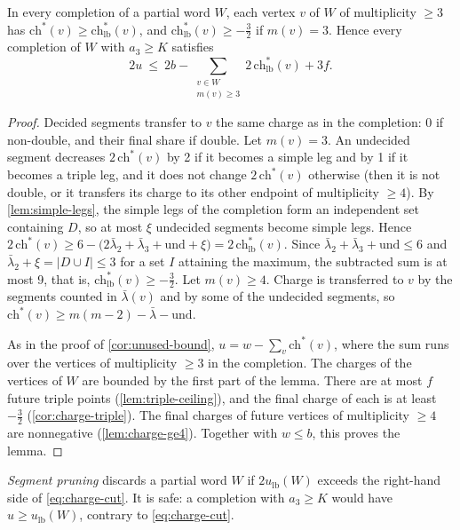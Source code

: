 \begin{lemma}\label{lem:placed-charges}
In every completion of a partial word $W$, each vertex $v$ of $W$ of multiplicity $\ge3$ has $\mathrm{ch}^*(v)\ge\mathrm{ch}^*_{\mathrm{lb}}(v)$, and $\mathrm{ch}^*_{\mathrm{lb}}(v)\ge-\tfrac32$ if $m(v)=3$.
Hence every completion of $W$ with $a_3\ge K$ satisfies
\begin{equation}\label{eq:charge-cut}
2u\ \le\ 2b-\sum_{\substack{v\in W\\ m(v)\ge3}}
2\,\mathrm{ch}^*_{\mathrm{lb}}(v)+3f .
\end{equation}
\end{lemma}
\begin{proof}
Decided segments transfer to $v$ the same charge as in the completion: 0 if non-double, and their final share if double.
Let $m(v)=3$. An undecided segment decreases $2\,\mathrm{ch}^*(v)$ by 2 if it becomes a simple leg and by 1 if it becomes a triple leg, and it does not change $2\,\mathrm{ch}^*(v)$ otherwise (then it is not double, or it transfers its charge to its other endpoint of multiplicity $\ge4$).
By \cref{lem:simple-legs}, the simple legs of the completion form an independent set containing $D$, so at most $\xi$ undecided segments become simple legs.
Hence $2\,\mathrm{ch}^*(v)\ge6-\bigl(2\bar\lambda_2+\bar\lambda_3+\mathrm{und}+\xi\bigr)=2\,\mathrm{ch}^*_{\mathrm{lb}}(v)$.
Since $\bar\lambda_2+\bar\lambda_3+\mathrm{und}\le6$ and $\bar\lambda_2+\xi=|D\cup I|\le3$ for a set $I$ attaining the maximum, the subtracted sum is at most 9, that is, $\mathrm{ch}^*_{\mathrm{lb}}(v)\ge-\tfrac32$.
Let $m(v)\ge4$. Charge is transferred to $v$ by the segments counted in $\bar\lambda(v)$ and by some of the undecided segments, so $\mathrm{ch}^*(v)\ge m(m-2)-\bar\lambda-\mathrm{und}$.

As in the proof of \cref{cor:unused-bound}, $u=w-\sum_v\mathrm{ch}^*(v)$, where the sum runs over the vertices of multiplicity $\ge3$ in the completion.
The charges of the vertices of $W$ are bounded by the first part of the lemma.
There are at most $f$ future triple points (\cref{lem:triple-ceiling}), and the final charge of each is at least $-\tfrac32$ (\cref{cor:charge-triple}). The final charges of future vertices of multiplicity $\ge4$ are nonnegative (\cref{lem:charge-ge4}).
Together with $w\le b$, this proves the lemma.
\end{proof}

\emph{Segment pruning} discards a partial word $W$ if $2u_{\mathrm{lb}}(W)$ exceeds the right-hand side of \eqref{eq:charge-cut}. It is safe: a completion with $a_3\ge K$ would have $u\ge u_{\mathrm{lb}}(W)$, contrary to \eqref{eq:charge-cut}.

